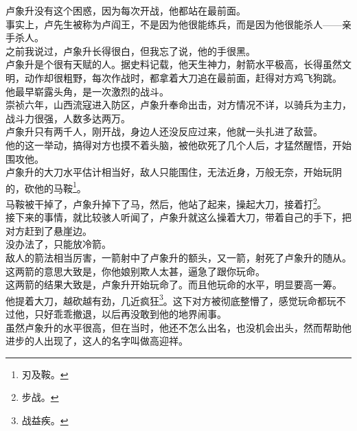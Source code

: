 \begin{multicols}{\theparacolNo}
卢象升没有这个困惑，因为每次开战，他都站在最前面。\\

事实上，卢先生被称为卢阎王，不是因为他很能练兵，而是因为他很能杀人——亲手杀人。\\

之前我说过，卢象升长得很白，但我忘了说，他的手很黑。\\

卢象升是个很有天赋的人。据史料记载，他天生神力，射箭水平极高，长得虽然文明，动作却很粗野，每次作战时，都拿着大刀追在最前面，赶得对方鸡飞狗跳。\\

他最早崭露头角，是一次激烈的战斗。\\

崇祯六年，山西流寇进入防区，卢象升奉命出击，对方情况不详，以骑兵为主力，战斗力很强，人数多达两万。\\

卢象升只有两千人，刚开战，身边人还没反应过来，他就一头扎进了敌营。\\

他的这一举动，搞得对方也摸不着头脑，被他砍死了几个人后，才猛然醒悟，开始围攻他。\\

卢象升的大刀水平估计相当好，敌人只能围住，无法近身，万般无奈，开始玩阴的，砍他的马鞍\footnote{刃及鞍。}。\\

马鞍被干掉了，卢象升掉下了马，然后，他站了起来，操起大刀，接着打\footnote{步战。}。\\

接下来的事情，就比较骇人听闻了，卢象升就这么操着大刀，带着自己的手下，把对方赶到了悬崖边。\\

没办法了，只能放冷箭。\\

敌人的箭法相当厉害，一箭射中了卢象升的额头，又一箭，射死了卢象升的随从。\\

这两箭的意思大致是，你他娘别欺人太甚，逼急了跟你玩命。\\

这两箭的结果大致是，卢象升开始玩命了。而且他玩命的水平，明显要高一筹。\\

他提着大刀，越砍越有劲，几近疯狂\footnote{战益疾。}。这下对方被彻底整懵了，感觉玩命都玩不过他，只好乖乖撤退，以后再没敢到他的地界闹事。\\

虽然卢象升的水平很高，但在当时，他还不怎么出名，也没机会出头，然而帮助他进步的人出现了，这人的名字叫做高迎祥。\\


\end{multicols}
